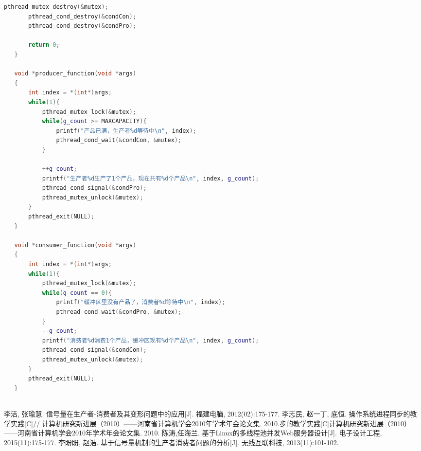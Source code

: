 \documentclass[withoutpreface,bwprint]{cumcmthesis} %
\begin{document}
\begin{appendices}
\begin{lstlisting}[language=c++]
       pthread_mutex_destroy(&mutex);
       pthread_cond_destroy(&condCon);
       pthread_cond_destroy(&condPro);
    
       return 0;
   }
    
   void *producer_function(void *args)
   {
       int index = *(int*)args;
       while(1){
           pthread_mutex_lock(&mutex);
           while(g_count >= MAXCAPACITY){
               printf("产品已满，生产者%d等待中\n", index);
               pthread_cond_wait(&condCon, &mutex);
           }
    
           ++g_count;
           printf("生产者%d生产了1个产品，现在共有%d个产品\n", index, g_count);
           pthread_cond_signal(&condPro);
           pthread_mutex_unlock(&mutex);
       }
       pthread_exit(NULL);
   }
    
   void *consumer_function(void *args)
   {
       int index = *(int*)args;
       while(1){
           pthread_mutex_lock(&mutex);
           while(g_count == 0){
               printf("缓冲区里没有产品了，消费者%d等待中\n", index);
               pthread_cond_wait(&condPro, &mutex);
           }
           --g_count;
           printf("消费者%d消费1个产品，缓冲区现有%d个产品\n", index, g_count);
           pthread_cond_signal(&condCon);
           pthread_mutex_unlock(&mutex);
       }
       pthread_exit(NULL);
   }
   
\end{lstlisting}
\end{appendices}
\begin{thebibliography}{9}%
    李洁, 张瑜慧. 信号量在生产者-消费者及其变形问题中的应用[J]. 福建电脑, 2012(02):175-177.
    李志民, 赵一丁, 底恒. 操作系统进程同步的教学实践[C]// 计算机研究新进展（2010）——河南省计算机学会2010年学术年会论文集. 2010.步的教学实践[C]计算机研究新进展（2010）——河南省计算机学会2010年学术年会论文集. 2010.
    陈涛,任海兰. 基于Linux的多线程池并发Web服务器设计[J]. 电子设计工程, 2015(11):175-177.
    李盼盼, 赵浩. 基于信号量机制的生产者消费者问题的分析[J]. 无线互联科技, 2013(11):101-102.
\end{thebibliography}

\newpage
 
\end{document}
